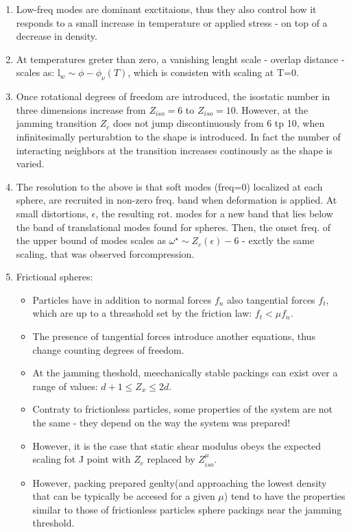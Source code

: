 \documentclass[10pt,a4paper]{article}
\begin{document}
\begin{enumerate}
 \item Low-freq modes are dominant exctitaions, thus they also control how it responds to a small increase in temperature or applied stress - on top of a decrease in density.
 \item At temperatures greter than zero, a vanishing lenght scale - overlap distance - scales as: $\mathrm{l}_{w} \sim \phi - \phi_{\nu}(T)$, which is consisten with scaling at T=0.
 \item Once rotational degrees of freedom are introduced, the isostatic number in three dimensions increase from $Z_{iso}=6$ to $Z_{iso}=10$.
 However, at the jamming transition $Z_c$ does not jump discontinuously from 6 tp 10, when infinitesimally perturabtion to the shape is introduced. 
 In fact the number of interacting neighbors at the transition increases continously as the shape is varied.
 \item The resolution to the above is that soft modes (freq=0) localized at each sphere, are recruited in non-zero freq. band when deformation is applied.
 At small distortions, $\epsilon$, the resulting rot. modes for a new band that lies below the band of translational modes found for spheres. 
 Then, the onset freq. of the upper bound of modes scales as $\omega^{\star}\sim Z_c(\epsilon) -6$ - exctly the same scaling, that was observed forcompression. 
 \item Frictional spheres:
 \begin{itemize}
  \item Particles have in addition to normal forces $f_n$ also tangential forces $f_t$, which are up to a threashold set by the friction law: $f_t < \mu f_n$.
  \item The presence of tangential forces introduce another equations, thus change counting degrees of freedom.
  \item At the jamming theshold, meechanically stable packings can exist over a range of values: $d+1 \le Z_x \le 2d$.
  \item Contraty to frictionless particles, some properties of the system are not the same - they depend on the way the system was prepared!
  \item However, it is the case that static shear modulus obeys the expected scaling fot J point with $Z_c$ replaced by $Z_{iso}^{\mu}$.
  \item However, packing prepared genlty(and approaching the lowest density that can be typically be accesed for a given $\mu$) 
  tend to have the properties similar to those of frictionless particles sphere packings near the jamming threshold.

\end{itemize}
\end{enumerate}
\end{document}
